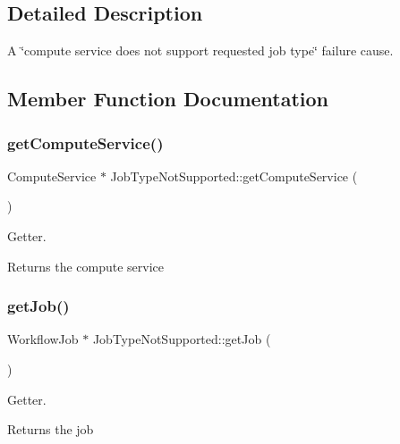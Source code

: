 \subsection{Detailed Description}
A \char`\"{}compute service does not support requested job type\char`\"{} failure cause. 

\subsection{Member Function Documentation}
\mbox{\label{class_job_type_not_supported_adef77cd0b3a6bbb8d1c6a253c6ad581b}} 
\subsubsection{\texorpdfstring{get\+Compute\+Service()}{getComputeService()}}
{\footnotesize\ttfamily Compute\+Service $\ast$ Job\+Type\+Not\+Supported\+::get\+Compute\+Service (\begin{DoxyParamCaption}{ }\end{DoxyParamCaption})}



Getter. 

\begin{DoxyReturn}{Returns}
the compute service 
\end{DoxyReturn}
\mbox{\label{class_job_type_not_supported_af05784134fac8f9a57ef4cbd3d740d38}} 
\subsubsection{\texorpdfstring{get\+Job()}{getJob()}}
{\footnotesize\ttfamily Workflow\+Job $\ast$ Job\+Type\+Not\+Supported\+::get\+Job (\begin{DoxyParamCaption}{ }\end{DoxyParamCaption})}



Getter. 

\begin{DoxyReturn}{Returns}
the job 
\end{DoxyReturn}
\mbox{\label{class_job_type_not_supported_ae9b87c93a2e6d509725ad7faf5357fc4}} 
